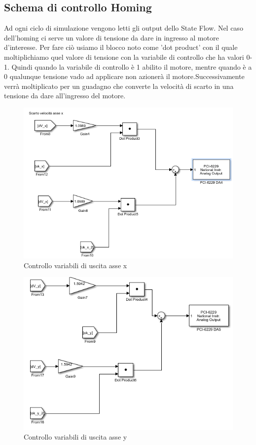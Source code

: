 \documentclass{article}
\begin{document}
\subsection{Schema di controllo Homing}
Ad ogni ciclo di simulazione vengono letti gli output dello State Flow. Nel caso dell'homing ci serve un valore di tensione da dare in ingresso al motore d'interesse. Per fare ciò usiamo il blocco noto come 'dot product' con il quale moltiplichiamo quel valore di tensione con la variabile di controllo che ha valori 0-1.
Quindi quando la variabile di controllo è 1 abilito il motore, mentre quando è a 0 qualunque tensione vado ad applicare non azionerà il motore.Successivamente verrà moltiplicato per un guadagno che converte la velocità di scarto in una tensione da dare all'ingresso del motore. 

\begin{figure}[H]
\centering
\includegraphics[width=.8\textwidth]{./stateflow/homingx.png}
\caption{Controllo variabili di uscita asse x}
\end{figure}

\begin{figure}[H]
\centering
\includegraphics[width=.8\textwidth]{./stateflow/homingy.png}
\caption{Controllo variabili di uscita asse y}
\end{figure}
\end{document}
